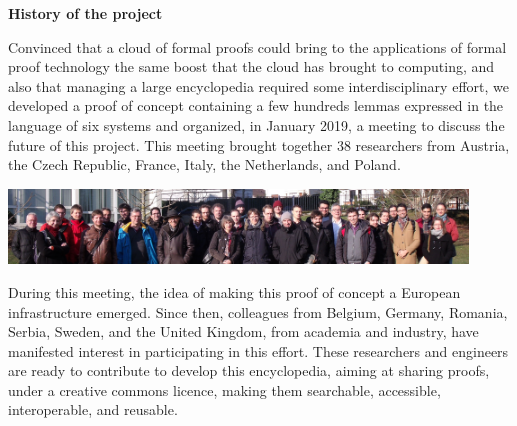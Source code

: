 \begin{shaded}
  \vspace*{-0.5cm}
  \begin{center}
    {\bf \Large History of the project}
  \end{center}

Convinced that a cloud of formal proofs could bring to the
applications of formal proof technology the same boost that the cloud
has brought to computing, and also that managing a large encyclopedia
required some interdisciplinary effort,
we developed a proof of concept containing a few hundreds lemmas
expressed in the language of six systems and organized, in January 2019,
a meeting to discuss the future of this project.
This
meeting brought together 38 researchers from Austria, the Czech
Republic, France, Italy, the Netherlands, and Poland.
\begin{center}
\includegraphics[height=2cm]{photo.png}
\end{center}
During this meeting, the idea of making this proof of concept a
European infrastructure emerged.  Since then, colleagues from Belgium,
Germany, Romania, Serbia, Sweden, and the United Kingdom, from
academia and industry, have manifested interest in participating in
this effort.  These researchers and engineers are ready to contribute
to develop this encyclopedia, aiming at sharing proofs, under a
creative commons licence, making them searchable, accessible,
interoperable, and reusable.
\end{shaded}

